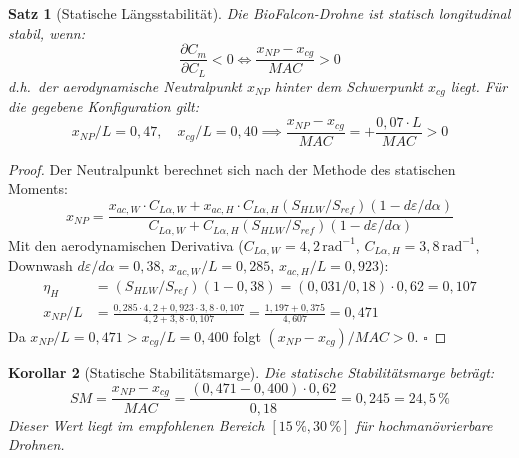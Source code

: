 ﻿\documentclass[12pt,a4paper]{article}
\newtheorem{theorem}{Satz}[section]
\newtheorem{korollar}[theorem]{Korollar}
\theoremstyle{remark}
\begin{document}
	\begin{theorem}[Statische Längsstabilität]
		\label{thm:stabilität}
		Die BioFalcon-Drohne ist statisch longitudinal stabil, wenn:
		\begin{equation}
			\frac{\partial C_m}{\partial C_L} < 0
			\iff
			\frac{x_{NP} - x_{cg}}{MAC} > 0
			\label{eq:stabilität}
		\end{equation}
		d.h.\ der aerodynamische Neutralpunkt $x_{NP}$ hinter dem Schwerpunkt $x_{cg}$
		liegt. Für die gegebene Konfiguration gilt:
		\begin{equation}
			x_{NP}/L = 0{,}47, \quad x_{cg}/L = 0{,}40
			\implies
			\frac{x_{NP} - x_{cg}}{MAC} = +\frac{0{,}07 \cdot L}{MAC} > 0
			\label{eq:sm}
		\end{equation}
	\end{theorem}
	
	\begin{proof}
		Der Neutralpunkt berechnet sich nach der Methode des statischen Moments:
		\begin{equation}
			x_{NP} = \frac{x_{ac,W} \cdot C_{L\alpha,W} + x_{ac,H} \cdot C_{L\alpha,H}
				(S_{HLW}/S_{ref})(1 - d\varepsilon/d\alpha)}
			{C_{L\alpha,W} + C_{L\alpha,H}(S_{HLW}/S_{ref})(1 - d\varepsilon/d\alpha)}
		\end{equation}
		Mit den aerodynamischen Derivativa ($C_{L\alpha,W} = 4{,}2\,\text{rad}^{-1}$,
		$C_{L\alpha,H} = 3{,}8\,\text{rad}^{-1}$, Downwash $d\varepsilon/d\alpha = 0{,}38$,
		$x_{ac,W}/L = 0{,}285$, $x_{ac,H}/L = 0{,}923$):
		\begin{align}
			\eta_H &= (S_{HLW}/S_{ref})(1 - 0{,}38) = (0{,}031/0{,}18)\cdot 0{,}62 = 0{,}107 \\
			x_{NP}/L &= \frac{0{,}285 \cdot 4{,}2 + 0{,}923 \cdot 3{,}8 \cdot 0{,}107}
			{4{,}2 + 3{,}8 \cdot 0{,}107}
			= \frac{1{,}197 + 0{,}375}{4{,}607}
			= 0{,}471
		\end{align}
		Da $x_{NP}/L = 0{,}471 > x_{cg}/L = 0{,}400$ folgt
		$(x_{NP}-x_{cg})/MAC > 0$. \qquad$\square$
	\end{proof}
	
	\begin{korollar}[Statische Stabilitätsmarge]
		\label{cor:sm}
		Die statische Stabilitätsmarge beträgt:
		\begin{equation}
			SM = \frac{x_{NP} - x_{cg}}{MAC}
			= \frac{(0{,}471 - 0{,}400) \cdot 0{,}62}{0{,}18}
			= 0{,}245 = 24{,}5\,\%
			\label{eq:sm_wert}
		\end{equation}
		Dieser Wert liegt im empfohlenen Bereich $[15\,\%, 30\,\%]$ für hochmanövrierbare
		Drohnen.
	\end{korollar}
	
\end{document}
